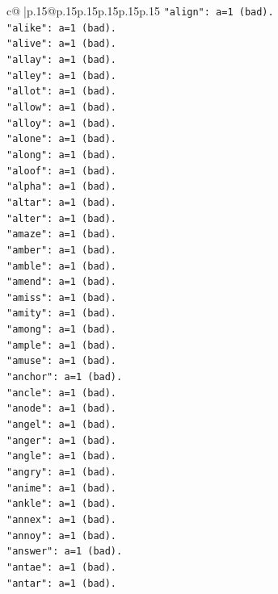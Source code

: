 \documentclass{article}
\begin{document}
{\begin{supertabular}{c@{$\;$}|p{.15\linewidth}@{}p{.15\linewidth}p{.15\linewidth}p{.15\linewidth}p{.15\linewidth}p{.15\linewidth}}
{{{\texttt{"align": a=1 (bad).} \\
\texttt{"alike": a=1 (bad).} \\
\texttt{"alive": a=1 (bad).} \\
\texttt{"allay": a=1 (bad).} \\
\texttt{"alley": a=1 (bad).} \\
\texttt{"allot": a=1 (bad).} \\
\texttt{"allow": a=1 (bad).} \\
\texttt{"alloy": a=1 (bad).} \\
\texttt{"alone": a=1 (bad).} \\
\texttt{"along": a=1 (bad).} \\
\texttt{"aloof": a=1 (bad).} \\
\texttt{"alpha": a=1 (bad).} \\
\texttt{"altar": a=1 (bad).} \\
\texttt{"alter": a=1 (bad).} \\
\texttt{"amaze": a=1 (bad).} \\
\texttt{"amber": a=1 (bad).} \\
\texttt{"amble": a=1 (bad).} \\
\texttt{"amend": a=1 (bad).} \\
\texttt{"amiss": a=1 (bad).} \\
\texttt{"amity": a=1 (bad).} \\
\texttt{"among": a=1 (bad).} \\
\texttt{"ample": a=1 (bad).} \\
\texttt{"amuse": a=1 (bad).} \\
\texttt{"anchor": a=1 (bad).} \\
\texttt{"ancle": a=1 (bad).} \\
\texttt{"anode": a=1 (bad).} \\
\texttt{"angel": a=1 (bad).} \\
\texttt{"anger": a=1 (bad).} \\
\texttt{"angle": a=1 (bad).} \\
\texttt{"angry": a=1 (bad).} \\
\texttt{"anime": a=1 (bad).} \\
\texttt{"ankle": a=1 (bad).} \\
\texttt{"annex": a=1 (bad).} \\
\texttt{"annoy": a=1 (bad).} \\
\texttt{"answer": a=1 (bad).} \\
\texttt{"antae": a=1 (bad).} \\
\texttt{"antar": a=1 (bad).} \\
}}}
\end{supertabular}}
\end{document}
